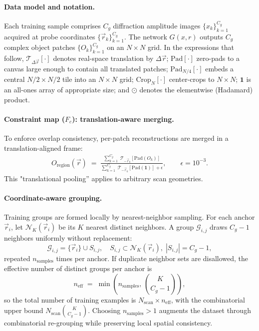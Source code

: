 \documentclass{optica-article}
\begin{document}
\paragraph{Data model and notation.}
Each training sample comprises $C_g$ diffraction amplitude images $\{x_k\}_{k=1}^{C_g}$ acquired at probe coordinates $\{\vec{r}_k\}_{k=1}^{C_g}$. The network $G(x,r)$ outputs $C_g$ complex object patches $\{O_k\}_{k=1}^{C_g}$ on an $N\times N$ grid. In the expressions that follow, $\mathcal{T}_{\Delta \vec{r}}[\cdot]$ denotes real-space translation by $\Delta \vec{r}$; $\mathrm{Pad}[\cdot]$ zero-pads to a canvas large enough to contain all translated patches; $\mathrm{Pad}_{N/4}[\cdot]$ embeds a central $N/2\times N/2$ tile into an $N\times N$ grid; $\mathrm{Crop}_N[\cdot]$ center-crops to $N\times N$; $\mathbf{1}$ is an all-ones array of appropriate size; and $\odot$ denotes the elementwise (Hadamard) product.

\paragraph{Constraint map ($F_c$): translation-aware merging.}
To enforce overlap consistency, per-patch reconstructions are merged in a translation-aligned frame:
\begin{align}
  O_{\text{region}}(\vec{r})
  \;=\;
  \frac{
    \sum_{k=1}^{C_g}\; \mathcal{T}_{-\vec{r}_k}\!\left[\mathrm{Pad}\!\left(O_k\right)\right]
  }{
    \sum_{k=1}^{C_g}\; \mathcal{T}_{-\vec{r}_k}\!\left[\mathrm{Pad}\!\left(\mathbf{1}\right)\right] + \epsilon
  },
  \qquad \epsilon=10^{-3}.
  \label{eq:constraintmap}
\end{align}
This "translational pooling'' applies to arbitrary scan geometries.

\paragraph{Coordinate-aware grouping.}
Training groups are formed locally by nearest-neighbor sampling. For each anchor $\vec{r}_i$, let $\mathcal{N}_K(\vec{r}_i)$ be its $K$ nearest distinct neighbors. A group $\mathcal{G}_{i,j}$ draws $C_g-1$ neighbors uniformly without replacement:
\[
\mathcal{G}_{i,j}=\{\vec{r}_i\}\cup S_{i,j},\quad S_{i,j}\subset \mathcal{N}_K(\vec{r}_i),\; |S_{i,j}|=C_g-1,
\]
repeated $n_{\text{samples}}$ times per anchor. If duplicate neighbor sets are disallowed, the effective number of distinct groups per anchor is
\[
n_{\text{eff}} \;=\; \min\!\left(n_{\text{samples}},\, \binom{K}{C_g - 1}\right),
\]
so the total number of training examples is $N_{\text{scan}} \times n_{\text{eff}}$, with the combinatorial upper bound $N_{\text{scan}} \binom{K}{C_g - 1}$. Choosing $n_{\text{samples}} > 1$ augments the dataset through combinatorial re-grouping while preserving local spatial consistency.
\end{document}
